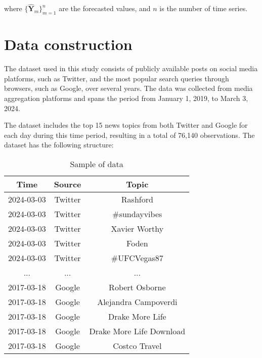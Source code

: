 where $\{\mathbf{\hat{Y}}_m\}_{m=1}^{n}$ are the forecasted values, and $n$ is the number of time series.




\section{Data construction}
\label{sec:headings}
The dataset used in this study consists of publicly available posts on social media platforms, such as Twitter, and the most popular search queries through browsers, such as Google, over several years. The data was collected from media aggregation platforms and spans the period from January 1, 2019, to March 3, 2024.

The dataset includes the top 15 news topics from both Twitter and Google for each day during this time period, resulting in a total of 76,140 observations. The dataset has the following structure:

\begin{table}[h]
\centering
\begin{tabular}{|c|c|c|}
\hline
\textbf{Time} & \textbf{Source} & \textbf{Topic}           \\ \hline
2024-03-03    & Twitter         & Rashford                 \\ \hline
2024-03-03    & Twitter         & \#sundayvibes            \\ \hline
2024-03-03    & Twitter         & Xavier Worthy            \\ \hline
2024-03-03    & Twitter         & Foden                    \\ \hline
2024-03-03    & Twitter         & \#UFCVegas87             \\ \hline
...           & ...             & ...                      \\ \hline
2017-03-18    & Google          & Robert Osborne           \\ \hline
2017-03-18    & Google          & Alejandra Campoverdi     \\ \hline
2017-03-18    & Google          & Drake More Life          \\ \hline
2017-03-18    & Google          & Drake More Life Download \\ \hline
2017-03-18    & Google          & Costco Travel            \\ \hline
\end{tabular}
\caption{Sample of data}
\label{tab:timefromtime}
\end{table}

